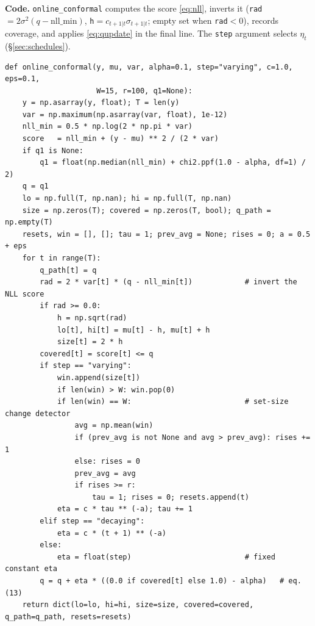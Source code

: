 \documentclass[11pt]{article}
\theoremstyle{plain}
\theoremstyle{definition}
\newcommand{\code}[1]{\texttt{#1}}
\begin{document}
\noindent\textbf{Code.} \code{online\_conformal} computes the score \eqref{eq:nll}, inverts it (\code{rad}$=2\sigma^2(q-\text{nll\_min})$, \code{h}$=c_{t+1|t}\sigma_{t+1|t}$; empty set when \code{rad}$<0$), records coverage, and applies \eqref{eq:qupdate} in the final line. The \code{step} argument selects $\eta_t$ (\S\ref{sec:schedules}).
\begin{lstlisting}
def online_conformal(y, mu, var, alpha=0.1, step="varying", c=1.0, eps=0.1,
                     W=15, r=100, q1=None):
    y = np.asarray(y, float); T = len(y)
    var = np.maximum(np.asarray(var, float), 1e-12)
    nll_min = 0.5 * np.log(2 * np.pi * var)
    score   = nll_min + (y - mu) ** 2 / (2 * var)
    if q1 is None:
        q1 = float(np.median(nll_min) + chi2.ppf(1.0 - alpha, df=1) / 2)
    q = q1
    lo = np.full(T, np.nan); hi = np.full(T, np.nan)
    size = np.zeros(T); covered = np.zeros(T, bool); q_path = np.empty(T)
    resets, win = [], []; tau = 1; prev_avg = None; rises = 0; a = 0.5 + eps
    for t in range(T):
        q_path[t] = q
        rad = 2 * var[t] * (q - nll_min[t])            # invert the NLL score
        if rad >= 0.0:
            h = np.sqrt(rad)
            lo[t], hi[t] = mu[t] - h, mu[t] + h
            size[t] = 2 * h
        covered[t] = score[t] <= q
        if step == "varying":
            win.append(size[t])
            if len(win) > W: win.pop(0)
            if len(win) == W:                          # set-size change detector
                avg = np.mean(win)
                if (prev_avg is not None and avg > prev_avg): rises += 1
                else: rises = 0
                prev_avg = avg
                if rises >= r:
                    tau = 1; rises = 0; resets.append(t)
            eta = c * tau ** (-a); tau += 1
        elif step == "decaying":
            eta = c * (t + 1) ** (-a)
        else:
            eta = float(step)                          # fixed constant eta
        q = q + eta * ((0.0 if covered[t] else 1.0) - alpha)   # eq. (13)
    return dict(lo=lo, hi=hi, size=size, covered=covered, q_path=q_path, resets=resets)
\end{lstlisting}

\end{document}
